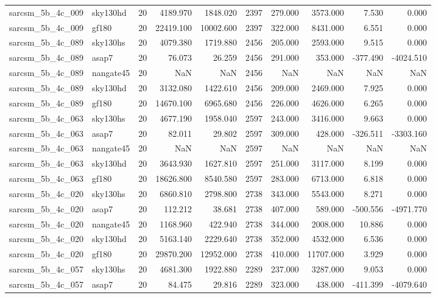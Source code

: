 \documentclass{article}
\begin{document}
\begin{longtable}{llrrrrrrrr}
sarcsm\_5b\_4c\_009 & sky130hd & 20 & 4189.970 & 1848.020 & 2397 & 279.000 & 3573.000 & 7.530 & 0.000 \\
sarcsm\_5b\_4c\_009 & gf180 & 20 & 22419.100 & 10002.600 & 2397 & 322.000 & 8431.000 & 6.551 & 0.000 \\
sarcsm\_5b\_4c\_089 & sky130hs & 20 & 4079.380 & 1719.880 & 2456 & 205.000 & 2593.000 & 9.515 & 0.000 \\
sarcsm\_5b\_4c\_089 & asap7 & 20 & 76.073 & 26.259 & 2456 & 291.000 & 353.000 & -377.490 & -4024.510 \\
sarcsm\_5b\_4c\_089 & nangate45 & 20 & NaN & NaN & 2456 & NaN & NaN & NaN & NaN \\
sarcsm\_5b\_4c\_089 & sky130hd & 20 & 3132.080 & 1422.610 & 2456 & 209.000 & 2469.000 & 7.925 & 0.000 \\
sarcsm\_5b\_4c\_089 & gf180 & 20 & 14670.100 & 6965.680 & 2456 & 226.000 & 4626.000 & 6.265 & 0.000 \\
sarcsm\_5b\_4c\_063 & sky130hs & 20 & 4677.190 & 1958.040 & 2597 & 243.000 & 3416.000 & 9.663 & 0.000 \\
sarcsm\_5b\_4c\_063 & asap7 & 20 & 82.011 & 29.802 & 2597 & 309.000 & 428.000 & -326.511 & -3303.160 \\
sarcsm\_5b\_4c\_063 & nangate45 & 20 & NaN & NaN & 2597 & NaN & NaN & NaN & NaN \\
sarcsm\_5b\_4c\_063 & sky130hd & 20 & 3643.930 & 1627.810 & 2597 & 251.000 & 3117.000 & 8.199 & 0.000 \\
sarcsm\_5b\_4c\_063 & gf180 & 20 & 18626.800 & 8540.580 & 2597 & 283.000 & 6713.000 & 6.818 & 0.000 \\
sarcsm\_5b\_4c\_020 & sky130hs & 20 & 6860.810 & 2798.800 & 2738 & 343.000 & 5543.000 & 8.271 & 0.000 \\
sarcsm\_5b\_4c\_020 & asap7 & 20 & 112.212 & 38.681 & 2738 & 407.000 & 589.000 & -500.556 & -4971.770 \\
sarcsm\_5b\_4c\_020 & nangate45 & 20 & 1168.960 & 422.940 & 2738 & 344.000 & 2008.000 & 10.886 & 0.000 \\
sarcsm\_5b\_4c\_020 & sky130hd & 20 & 5163.140 & 2229.640 & 2738 & 352.000 & 4532.000 & 6.536 & 0.000 \\
sarcsm\_5b\_4c\_020 & gf180 & 20 & 29870.200 & 12952.000 & 2738 & 410.000 & 11707.000 & 3.929 & 0.000 \\
sarcsm\_5b\_4c\_057 & sky130hs & 20 & 4681.300 & 1922.880 & 2289 & 237.000 & 3287.000 & 9.053 & 0.000 \\
sarcsm\_5b\_4c\_057 & asap7 & 20 & 84.475 & 29.816 & 2289 & 323.000 & 438.000 & -411.399 & -4079.640 \\

\end{longtable}
\end{document}
